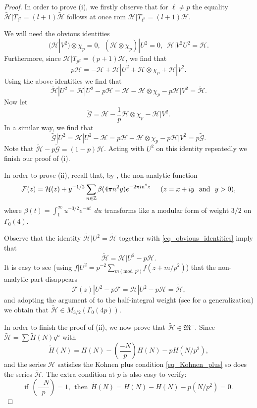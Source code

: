 \documentclass[11pt,letterpaper]{amsart}
\newcommand{\Z}{{\mathbb Z}}
\newcommand{\cF}{{\mathcal F}}
\newcommand{\cG}{{\mathcal G}}
\newcommand{\cH}{{\mathcal H}}
\newcommand{\gM}{{\mathfrak M}}
\theoremstyle{remark}
\begin{document}
\begin{proof}


In order to prove (i), we firstly observe that for $\ell \neq p$ the equality $\tilde{\cH}|T_{\ell^2} = (l+1) \tilde{\cH}$ follows at once rom  ${\cH}|T_{\ell^2} = (l+1) {\cH}$.

We will need  the obvious identities 
\begin{equation} \label{eq_obvious_identities}
(\cH|V^2) \otimes \chi_p = 0, ~~ (\cH \otimes \chi_p)|U^2 = 0, ~~ \cH|V^2U^2 = \cH.
\end{equation}
Furthermore, since $\cH|T_{p^2} = (p+1) \cH$, we find that 
\[ 
p\cH = - \cH + \cH|U^2+\cH \otimes \chi_p + \cH|V^2.
\]
Using the above identities we find that 
\[
\tilde{\cH}|U^2 = \cH|U^2- p\cH = \cH-\cH \otimes \chi_p - p\cH|V^2 = \tilde{\cH}.
\] 
Now let 
\[
\tilde{\cG} = \cH - \frac{1}{p} \cH \otimes \chi_p - \cH|V^2.
\]
In a similar way, we find that 
\[
\tilde{\cG}|U^2 = \cH|U^2 - \cH = p\cH - \cH\otimes \chi_p - p \cH|V^2 = p \tilde{\cG}.
\]
Note that $\tilde{\cH} - p\tilde{\cG} = (1-p) \cH$. Acting with $U^2$ on this identity repeatedly we finish our proof of  (i). 

In order to prove (ii), recall that, by \cite[Th\'eor\`eme 2]{Zagier_eis}, the non-analytic function 
\[
\cF(z) = \cH(z) + y^{-1/2} \sum_{n \in \Z} \beta(4\pi n^2 y) e^{-2\pi i n^2 z} \hspace{5mm} (z=x+iy ~~ \text{and} ~~ y>0),
\]
where $\beta(t) = \int_1^\infty u^{-3/2} e^{-ut} ~~ du$ transforms like a modular form of weight $3/2$ on $\Gamma_0(4)$.

Observe that the identity $\tilde{\cH}|U^2=\tilde{\cH}$ together with  \eqref{eq_obvious_identities} imply that
\[
\tilde{\cH} = \cH|U^2 - p\cH.
\]
It is easy to see (using $f|U^2 = p^{-2} \sum_ {m \pmod {p^2}} f(z+m/p^2)$) that the non-analytic part disappears
\[
\cF(z) |U^2 - p\cF = \cH|U^2 - p\cH = \tilde{\cH},
\]
and adopting the argument of \cite[Lemma 1]{Li}  to the half-integral weight (see \cite[Lemma 2.3(1)]{BK} for a generalization)  we obtain 
that $\tilde{\cH} \in M_{3/2}(\Gamma_0(4p))$. 

In order to finish the proof of (ii), we now prove that $\tilde{\cH} \in \gM^-$. 
Since $\tilde{\cH} = \sum \tilde{H}(N)q^n$ with
\begin{equation} \label{eq_t_H}
\tilde{H}(N) = H(N) - \left( \frac{-N}{p} \right)H(N) - pH(N/p^2),
\end{equation}
and the series $\cH$ satisfies the Kohnen plus condition \eqref{eq_Kohnen_plus} so does the series $\tilde{\cH}$. 
The extra condition at $p$ is also easy to verify:
\[
\text{if} ~~ \left( \frac{-N}{p} \right) = 1, ~~ \text{then} ~~ \tilde{H}(N) = H(N)-H(N) - p(N/p^2) =  0.
\]
\end{proof}
\end{document}
